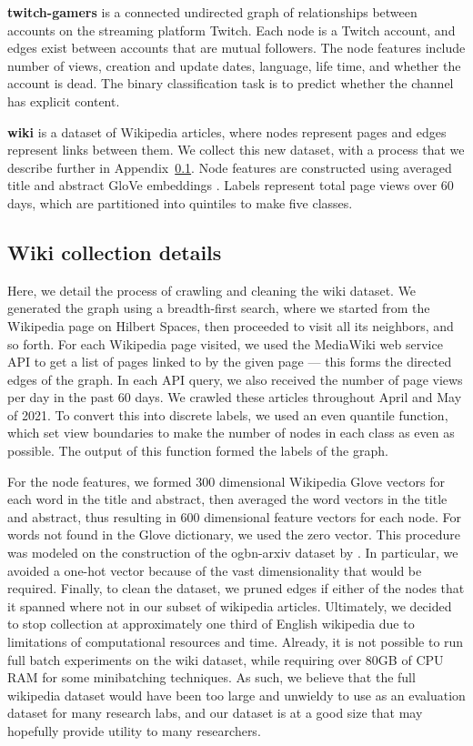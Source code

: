 \documentclass{article}
\newcommand{\myparagraph}[1]{\noindent \textbf{#1}}
\begin{document}
\myparagraph{twitch-gamers} \cite{rozemberczki2021twitch} is a connected undirected graph of relationships between accounts on the streaming platform Twitch. Each node is a Twitch account, and edges exist between accounts that are mutual followers. The node features include number of views, creation and update dates, language, life time, and whether the account is dead. The binary classification task is to predict whether the channel has explicit content.


\myparagraph{wiki} is a dataset of Wikipedia articles, where nodes represent pages and edges represent links between them. We collect this new dataset, with a process that we describe further in Appendix~\ref{sec:wiki}. Node features are constructed using averaged title and abstract GloVe embeddings \cite{pennington-etal-2014-glove}. Labels represent total page views over 60 days, which are partitioned into quintiles to make five classes.

\subsection{Wiki collection details}\label{sec:wiki}


Here, we detail the process of crawling and cleaning the wiki dataset. We generated the graph using a breadth-first search, where we started from the Wikipedia page on Hilbert Spaces, then proceeded to visit all its neighbors, and so forth. For each Wikipedia page visited, we used the MediaWiki web service API to get a list of pages linked to by the given page — this forms the directed edges of the graph. In each API query, we also received the number of page views per day in the past 60 days. We crawled these articles throughout April and May of 2021. To convert this into discrete labels, we used an even quantile function, which set view boundaries to make the number of nodes in each class as even as possible. The output of this function formed the labels of the graph. 

For the node features, we formed 300 dimensional Wikipedia Glove vectors \cite{pennington-etal-2014-glove} for each word in the title and abstract, then averaged the word vectors in the title and abstract, thus resulting in 600 dimensional feature vectors for each node. For words not found in the Glove dictionary, we used the zero vector. This procedure was modeled on the construction of the ogbn-arxiv dataset by \cite{hu2020open}. In particular, we avoided a one-hot vector because of the vast dimensionality that would be required. Finally, to clean the dataset, we pruned edges if either of the nodes that it spanned where not in our subset of wikipedia articles. 
Ultimately, we decided to stop collection at approximately one third of English wikipedia due to limitations of computational resources and time. Already, it is not possible to run full batch experiments on the wiki dataset, while requiring over 80GB of CPU RAM for some minibatching techniques. As such, we believe that the full wikipedia dataset would have been too large and unwieldy to use as an evaluation dataset for many research labs, and our dataset is at a good size that may hopefully provide utility to many researchers.
\end{document}
